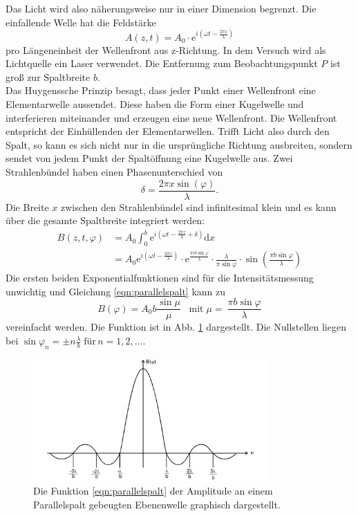 Das Licht wird also näherungsweise nur in einer Dimension begrenzt.
Die einfallende Welle hat die Feldstärke
\begin{equation*}
    A(z,t) = A_0 \cdot \mathrm{e}^{i(\omega t - \frac{2 \pi z}{\lambda})}
\end{equation*}
pro Längeneinheit der Wellenfront aus z-Richtung.
In dem Versuch wird als Lichtquelle ein Laser verwendet.
Die Entfernung zum Beobachtungspunkt $P$ ist groß zur Spaltbreite $b$.
\\
Das Huygenssche Prinzip besagt, dass jeder Punkt einer Wellenfront eine Elementarwelle aussendet.
Diese haben die Form einer Kugelwelle und interferieren miteinander und erzeugen eine neue Wellenfront.
Die Wellenfront entspricht der Einhüllenden der Elementarwellen.
Trifft Licht also durch den Spalt, so kann es sich nicht nur in die ursprüngliche Richtung ausbreiten, sondern sendet von jedem Punkt der Spaltöffnung eine Kugelwelle aus.
Zwei Strahlenbündel haben einen Phasenunterschied von
\begin{equation}
    \delta = \frac{2\pi x \sin (\varphi)}{\lambda} .
\end{equation}
Die Breite $x$ zwischen den Strahlenbündel sind infinitesimal klein und es kann über die gesamte Spaltbreite integriert werden:
\begin{align}
    B(z,t,\varphi) &= A_0 \int_0^b \mathrm{e}^{i(\omega t - \frac{2 \pi z}{\lambda} + \delta)} \mathrm{d}x \\
    &= A_0 \mathrm{e}^{i \left (\omega t - \frac{2 \pi z}{\lambda} \right )} \cdot \mathrm{e}^{\frac{\pi i b \sin \varphi}{\lambda}} \cdot \frac{\lambda}{\pi \sin \varphi} \cdot \sin \left (\frac{\pi b \sin \varphi}{\lambda} \right )
   \label{eqn:parallelspalt}
\end{align}
Die ersten beiden Exponentialfunktionen sind für die Intensitätsmessung unwichtig und Gleichung \eqref{eqn:parallelspalt} kann zu
\begin{equation}
    B(\varphi) = A_0 b \frac{\sin \mu}{\mu} \;\;\; \text{mit} \; \mu =\ \frac{\pi b \sin \varphi}{\lambda}
\end{equation}
vereinfacht werden.
Die Funktion ist in Abb. \ref{fig:funktion_parallel} dargestellt.
Die Nullstellen liegen bei $\sin \varphi_n = \pm n \frac{\lambda}{b} \; \text{für} \, n = 1, 2, ...$.
\begin{figure}
    \centering
    \includegraphics[width=0.8\textwidth]{content/data/funktion_parallel.jpg}
    \caption{Die Funktion \eqref{eqn:parallelspalt} der Amplitude an einem Parallelspalt gebeugten Ebenenwelle graphisch dargestellt. \cite[4]{anleitung}}
    \label{fig:funktion_parallel}
\end{figure}
